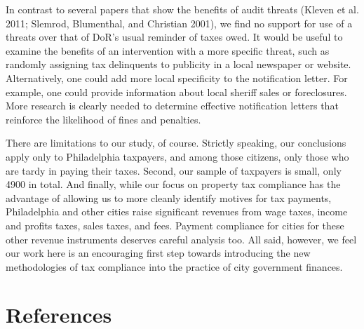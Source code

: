 \documentclass[12pt,titlepage]{article}
\begin{document}
In contrast to several papers that show the benefits of audit threats
(Kleven et al. 2011; Slemrod, Blumenthal, and Christian 2001), we find
no support for use of a threats over that of DoR's usual reminder of
taxes owed.  It would be useful to examine the benefits of an
intervention with a more specific threat, such as randomly assigning
tax delinquents to publicity in a local newspaper or website.
Alternatively, one could add more local specificity to the
notification letter. For example, one could provide information about
local sheriff sales or foreclosures. More research is clearly needed
to determine effective notification letters that reinforce the
likelihood of fines and penalties.


There are limitations to our study, of course.  Strictly speaking, our
conclusions apply only to Philadelphia taxpayers, and among those
citizens, only those who are tardy in paying their taxes. Second, our
sample of taxpayers is small, only 4900 in total.  And finally, while
our focus on property tax compliance has the advantage of allowing us
to more cleanly identify motives for tax payments, Philadelphia and
other cities raise significant revenues from wage taxes, income and
profits taxes, sales taxes, and fees.  Payment compliance for cities
for these other revenue instruments deserves careful analysis too.
All said, however, we feel our work here is an encouraging first step
towards introducing the new methodologies of tax compliance into the
practice of city government finances.

\newpage

\section*{References}
\end{document}

